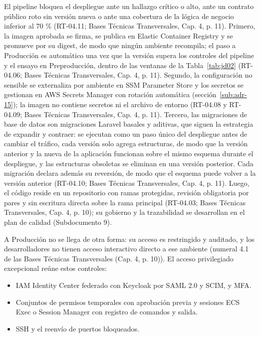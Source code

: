 El pipeline bloquea el despliegue ante un hallazgo crítico o alto, ante un contrato público roto sin versión nueva o ante una cobertura de la lógica de negocio inferior al 70 \% (RT-04.11; Bases Técnicas Transversales, Cap. 4, p. 11). Primero, la imagen aprobada se firma, se publica en Elastic Container Registry y se promueve por su digest, de modo que ningún ambiente recompila; el paso a Producción es automático una vez que la versión supera los controles del pipeline y el ensayo en Preproducción, dentro de las ventanas de la Tabla~\ref{tab:jd02} (RT-04.06; Bases Técnicas Transversales, Cap. 4, p. 11). Segundo, la configuración no sensible se externaliza por ambiente en SSM Parameter Store y los secretos se gestionan en AWS Secrets Manager con rotación automática (sección~\ref{sub:adr-15}); la imagen no contiene secretos ni el archivo de entorno (RT-04.08 y RT-04.09; Bases Técnicas Transversales, Cap. 4, p. 11). Tercero, las migraciones de base de datos son migraciones Laravel basales y aditivas, que siguen la estrategia de expandir y contraer: se ejecutan como un paso único del despliegue antes de cambiar el tráfico, cada versión solo agrega estructuras, de modo que la versión anterior y la nueva de la aplicación funcionan sobre el mismo esquema durante el despliegue, y las estructuras obsoletas se eliminan en una versión posterior. Cada migración declara además su reversión, de modo que el esquema puede volver a la versión anterior (RT-04.10; Bases Técnicas Transversales, Cap. 4, p. 11). Luego, el código reside en un repositorio con ramas protegidas, revisión obligatoria por pares y sin escritura directa sobre la rama principal (RT-04.03; Bases Técnicas Transversales, Cap. 4, p. 10); su gobierno y la trazabilidad se desarrollan en el plan de calidad (Subdocumento 9).

A Producción no se llega de otra forma: su acceso es restringido y auditado, y los desarrolladores no tienen acceso interactivo directo a ese ambiente (numeral 4.1 de las Bases Técnicas Transversales (Cap. 4, p. 10)). El acceso privilegiado excepcional reúne estos controles:

\begin{itemize}
  \item IAM Identity Center federado con Keycloak por SAML 2.0 y SCIM, y MFA.
  \item Conjuntos de permisos temporales con aprobación previa y sesiones ECS Exec o Session Manager con registro de comandos y salida.
  \item SSH y el reenvío de puertos bloqueados.
\end{itemize}

